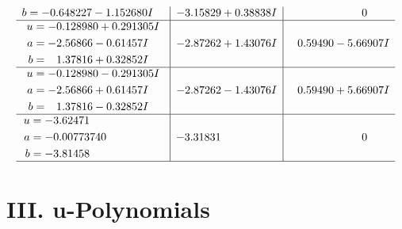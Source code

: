 \documentclass[1p]{elsarticle_modified}
\theoremstyle{definition}
\begin{document}
$$\begin{array}{c|c|c}
\begin{aligned}
b &= -0.648227 - 1.152680 I\end{aligned}
 & -3.15829 + 0.38838 I & \phantom{-0.000000 } 0 \\ \hline\begin{aligned}
u &= -0.128980 + 0.291305 I \\
a &= -2.56866 - 0.61457 I \\
b &= \phantom{-}1.37816 + 0.32852 I\end{aligned}
 & -2.87262 + 1.43076 I & \phantom{-}0.59490 - 5.66907 I \\ \hline\begin{aligned}
u &= -0.128980 - 0.291305 I \\
a &= -2.56866 + 0.61457 I \\
b &= \phantom{-}1.37816 - 0.32852 I\end{aligned}
 & -2.87262 - 1.43076 I & \phantom{-}0.59490 + 5.66907 I \\ \hline\begin{aligned}
u &= -3.62471\phantom{ +0.000000I} \\
a &= -0.00773740\phantom{ +0.000000I} \\
b &= -3.81458\phantom{ +0.000000I}\end{aligned}
 & -3.31831\phantom{ +0.000000I} & \phantom{-0.000000 } 0\\
 \hline 
 \end{array}$$\newpage
\newpage\renewcommand{\arraystretch}{1}
\centering \section*{ III. u-Polynomials}
\end{document}
